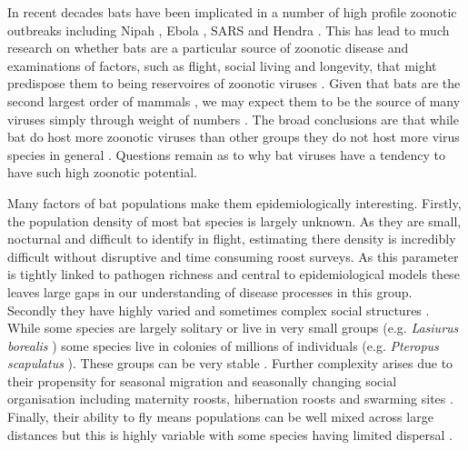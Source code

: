 In recent decades bats have been implicated in a number of high profile zoonotic outbreaks including Nipah \cite{field2001natural, halpin2011pteropid}, Ebola \cite{leroy2005fruit}, SARS \cite{li2005bats} and Hendra \cite{field2001natural}.
This has lead to much research on whether bats are a particular source of zoonotic disease \cite{luis2013comparison, olival2015bats, wang2011mass} and examinations of factors, such as flight, social living and longevity, that might predispose them to being reservoires of zoonotic viruses \cite{calisher2006bats, o2014bat, dobson2005links, racey2015uniqueness, kuzmin2011bats}.
Given that bats are the second largest order of mammals \cite{wilson2005mammal}, we may expect them to be the source of many viruses simply through weight of numbers \cite{luis2013comparison}.
The broad conclusions are that while bat do host more zoonotic viruses than other groups \cite{luis2013comparison} they do not host more virus species in general \cite{olival2015bats}.
Questions remain as to why bat viruses have a tendency to have such high zoonotic potential.

Many factors of bat populations make them epidemiologically interesting.
Firstly, the population density of most bat species is largely unknown.
As they are small, nocturnal and difficult to identify in flight, estimating there density is incredibly difficult without disruptive and time consuming roost surveys.
As this parameter is tightly linked to pathogen richness \cite{kamiya2014determines} and central to epidemiological models \cite{may1979population, anderson1979population} these leaves large gaps in our understanding of disease processes in this group.
Secondly they have highly varied and sometimes complex social structures \cite{kerth2008causes}.
While some species are largely solitary or live in very small groups (e.g. \emph{Lasiurus borealis} \cite{shump1982lasiurus}) some species live in colonies of millions of individuals (e.g. \emph{Pteropus scapulatus} \cite{birt2008little}).
These groups can be very stable \cite{kerth2011bats, mccracken1981social}.
Further complexity arises due to their propensity for seasonal migration \cite{fleming2003ecology, richter2008first, cryan2014continental} and seasonally changing social organisation including maternity roosts, hibernation roosts and swarming sites \cite{kerth2008causes}.
Finally, their ability to fly means populations can be well mixed across large distances \cite{peel2013continent, petit1999male} but this is highly variable with some species having limited dispersal \cite{wilmer1994extreme}.






